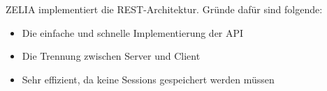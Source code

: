 
ZELIA implementiert die REST-Architektur. Gründe dafür sind folgende: 

\begin{itemize}
    \item Die einfache und schnelle Implementierung der API 
    \item Die Trennung zwischen Server und Client 
    \item Sehr effizient, da keine Sessions gespeichert werden müssen 
\end{itemize}
\cite{WikiREST}